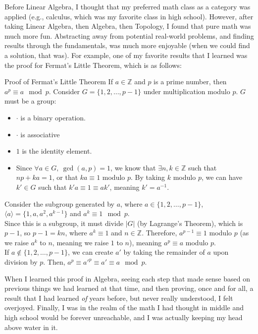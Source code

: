 \documentclass[8pt]{extarticle}
\newcommand{\Z}{\mathbb{Z}}
\begin{document}
  Before Linear Algebra, I thought that my preferred math class as a category was applied (e.g., calculus, which was my favorite class in high school). However, after taking Linear Algebra, then Algebra, then Topology, I found that pure math was much more fun. Abstracting away from potential real-world problems, and finding results through the fundamentals, was much more enjoyable (when we could find a solution, that was). For example, one of my favorite results that I learned was the proof for Fermat's Little Theorem, which is as follows:
  \begin{problem}{Proof of Fermat's Little Theorem}
    If $a\in\Z$ and $p$ is a prime number, then $a^p \equiv a\mod p$.
    \tcblower
    Consider $G = \{1,2,\dots,p-1\}$ under multiplication modulo $p$. $G$ must be a group:
    \begin{itemize}
      \item $\cdot$ is a binary operation.
      \item $\cdot$ is associative
      \item $1$ is the identity element.
      \item Since $\forall a\in G,~\gcd(a,p) = 1$, we know that $\exists n,k\in \Z$ such that $np + ka = 1$, or that $ka \equiv 1$ modulo $p$. By taking $k$ modulo $p$, we can have $k'\in G$ such that $k'a \equiv 1 \equiv ak'$, meaning $k' = a^{-1}$.
    \end{itemize}
    Consider the subgroup generated by $a$, where $a\in\{1,2,\dots,p-1\}$, $\langle a \rangle = \{1,a,a^2,a^{k-1}\}$ and $a^k \equiv 1\mod p$.\\

    Since this is a subgroup, it must divide $|G|$ (by Lagrange's Theorem), which is $p-1$, so $p-1 = kn$, where $a^k \equiv 1$ and $n\in\Z$. Therefore, $a^{p-1} \equiv 1$ modulo  $p$ (as we raise $a^k$ to $n$, meaning we raise $1$ to $n$), meaning $a^p \equiv a$ modulo $p$.\\

    If $a\notin \{1,2,\dots,p-1\}$, we can create $a'$ by taking the remainder of $a$ upon division by $p$. Then, $a^{p} \equiv a'^{p} \equiv a' \equiv a\mod p$.
  \end{problem}
  When I learned this proof in Algebra, seeing each step that made sense based on previous things we had learned at that time, and then proving, once and for all, a result that I had learned \textit{of} years before, but never really understood, I felt overjoyed. Finally, I was in the realm of the math I had thought in middle and high school would be forever unreachable, and I was actually keeping my head above water in it.\\
\end{document}
